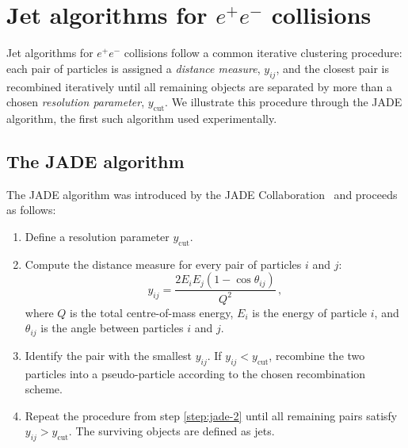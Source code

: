 

\section{Jet algorithms for $e^+e^-$ collisions}
\label{subsec: e+e-}

Jet algorithms for $e^+e^-$ collisions follow a common iterative clustering procedure: each pair of particles is assigned a \emph{distance measure}, $y_{ij}$, and the closest pair is recombined iteratively until all remaining objects are separated by more than a chosen \emph{resolution parameter}, $y_{\mathrm{cut}}$.
We illustrate this 
procedure through the JADE algorithm, the first such algorithm used 
experimentally.

\subsection{The JADE algorithm}
\label{subsec:JADE}

The JADE algorithm was introduced by the JADE 
Collaboration~\cite{JADE:1988xlj} and proceeds as follows:
\begin{enumerate}
    \item Define a resolution parameter $y_{\mathrm{cut}}$.
    
    \item \label{step:jade-2} Compute the distance measure for every pair of particles $i$ and $j$:
    \begin{equation}
        \label{eq:yij-jade}
        y_{ij} = \frac{2E_iE_j(1 - \cos\theta_{ij})}{Q^2}\,,
    \end{equation}
    where $Q$ is the total centre-of-mass energy, $E_i$ is the energy of particle $i$, and $\theta_{ij}$ is the angle between particles $i$ and $j$.
    
    \item Identify the pair with the smallest $y_{ij}$. If $y_{ij} < y_{\mathrm{cut}}$, 
    recombine the two particles into a pseudo-particle according to the chosen recombination scheme.
    
    \item Repeat the procedure from step \ref{step:jade-2} until all remaining pairs satisfy $y_{ij} > y_{\mathrm{cut}}$. The surviving objects are defined as jets.
\end{enumerate}

